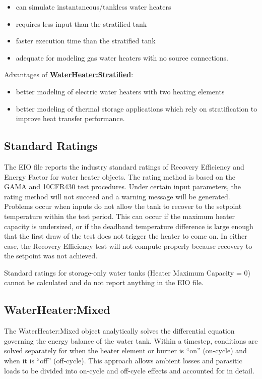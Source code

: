 \begin{itemize}
\item
  can simulate instantaneous/tankless water heaters
\item
  requires less input than the stratified tank
\item
  faster execution time than the stratified tank
\item
  adequate for modeling gas water heaters with no source connections.
\end{itemize}

Advantages of \textbf{\hyperref[waterheaterstratified]{WaterHeater:Stratified}}:

\begin{itemize}
\item
  better modeling of electric water heaters with two heating elements
\item
  better modeling of thermal storage applications which rely on stratification to improve heat transfer performance.
\end{itemize}

\subsection{Standard Ratings}\label{standard-ratings}

The EIO file reports the industry standard ratings of Recovery Efficiency and Energy Factor for water heater objects. The rating method is based on the GAMA and 10CFR430 test procedures. Under certain input parameters, the rating method will not succeed and a warning message will be generated. Problems occur when inputs do not allow the tank to recover to the setpoint temperature within the test period. This can occur if the maximum heater capacity is undersized, or if the deadband temperature difference is large enough that the first draw of the test does not trigger the heater to come on. In either case, the Recovery Efficiency test will not compute properly because recovery to the setpoint was not achieved.

Standard ratings for storage-only water tanks (Heater Maximum Capacity = 0) cannot be calculated and do not report anything in the EIO file.

\subsection{WaterHeater:Mixed}\label{waterheatermixed}

The WaterHeater:Mixed object analytically solves the differential equation governing the energy balance of the water tank. Within a timestep, conditions are solved separately for when the heater element or burner is ``on'' (on-cycle) and when it is ``off'' (off-cycle). This approach allows ambient losses and parasitic loads to be divided into on-cycle and off-cycle effects and accounted for in detail.

